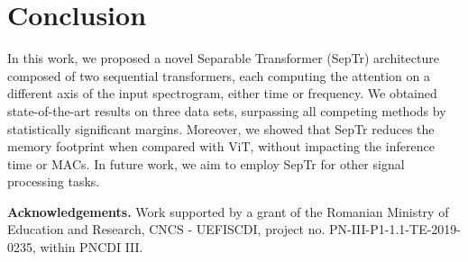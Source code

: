\documentclass[a4paper]{article}
\begin{document}
\section{Conclusion}
In this work, we proposed a novel Separable Transformer (SepTr) architecture composed of two sequential transformers, each computing the attention on a different axis of the input spectrogram, either time or frequency. We obtained state-of-the-art results on three data sets, surpassing all competing methods by statistically significant margins. Moreover, we showed that SepTr reduces the memory footprint when compared with ViT, without impacting the inference time or MACs. In future work, we aim to employ SepTr for other signal processing tasks.

\vspace{0.2cm}
\noindent
{\bf Acknowledgements.} Work supported by a grant of the Romanian Ministry of Education and Research, CNCS - UEFISCDI, project no. PN-III-P1-1.1-TE-2019-0235, within PNCDI III.



\end{document}

